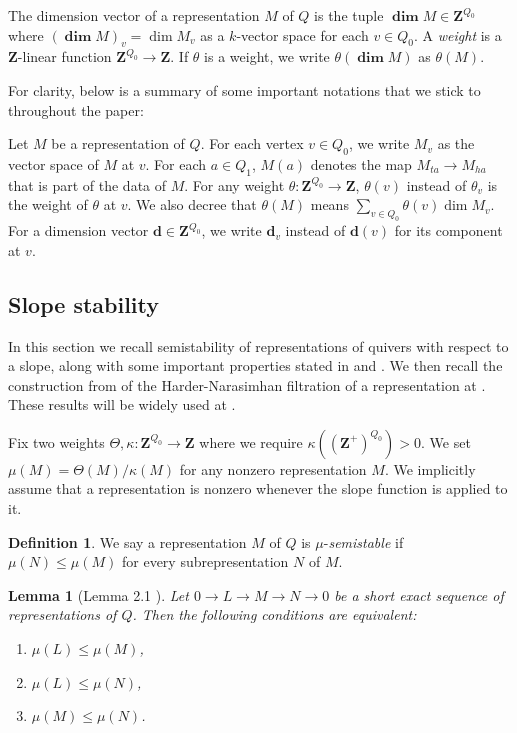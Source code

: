 \documentclass[a4paper]{amsart}
\numberwithin{equation}{section}
\theoremstyle{plain}
\newtheorem{lemma}[theorem]{Lemma}
\theoremstyle{definition}
\newtheorem{definition}[theorem]{Definition}
\newenvironment{notation}[1][Notation]
{\begin{trivlist} \item[\hskip \labelsep {\bfseries #1}]}
{\end{trivlist}}
\begin{document}
The dimension vector of a representation $M$ of $Q$ is the tuple $\pmb{\dim} M\in \mathbf{Z}^{Q_0}$ where $(\pmb{\dim} M)_v = \dim M_v$ as a $k$-vector space for each $v\in Q_0$. A \emph{weight} is a $\mathbf{Z}$-linear function $\mathbf{Z}^{Q_0}\rightarrow\mathbf{Z}$. If $\theta$ is a weight, we write $\theta(\pmb{\dim} M)$ as $\theta(M)$.

For clarity, below is a summary of some important notations that we stick to throughout the paper:
\begin{notation}
Let $M$ be a representation of $Q$. For each vertex $v\in Q_0$, we write $M_v$ as the vector space of $M$ at $v$. For each $a\in Q_1$, $M(a)$ denotes the map $M_{ta}\rightarrow M_{ha}$ that is part of the data of $M$. For any weight  $\theta:\mathbf{Z}^{Q_0}\rightarrow\mathbf{Z}$, $\theta(v)$ instead of $\theta_v$ is the weight of $\theta$ at $v$. We also decree that $\theta(M)$ means $\sum_{v\in Q_0}\theta(v)\dim M_v$. For a dimension vector $\mathbf{d}\in \mathbf{Z}^{Q_0}$, we write $\mathbf{d}_v$ instead of $\mathbf{d}(v)$ for its component at $v$. 
\end{notation}

\subsection{Slope stability}
In this section we recall semistability of representations of quivers with respect to a slope, along with some important properties stated in  and . We then recall the construction from \cite{MR1906875} of the Harder-Narasimhan filtration of a representation at . These results will be widely used at . 

Fix two weights $\Theta,\kappa:\mathbf{Z}^{Q_0}\rightarrow\mathbf{Z}$ where we require $\kappa((\mathbf{Z}^{+})^{Q_0})> 0$.  We set $\mu(M)=\Theta(M)/\kappa(M)$ for any nonzero representation $M$. We implicitly assume that a representation is nonzero whenever the slope function is applied to it. 
\begin{definition}\label{def_slope_stab}
We say a representation $M$ of $Q$ is $\mu$-\emph{semistable} if $\mu(N)\leq \mu(M)$ for every subrepresentation $N$ of $M$. 
\end{definition}

\begin{lemma}[Lemma 2.1 \cite{MR1906875} ]\label{scissor}
Let $0\rightarrow L\rightarrow M\rightarrow N\rightarrow 0$ be a short exact sequence of representations of $Q$. Then the following conditions are equivalent:
\begin{enumerate}
    \item $\mu(L)\leq \mu(M)$,
    \item $\mu(L)\leq\mu(N)$,
    \item $\mu(M)\leq\mu(N)$.
\end{enumerate}
\end{lemma}
\end{document}
